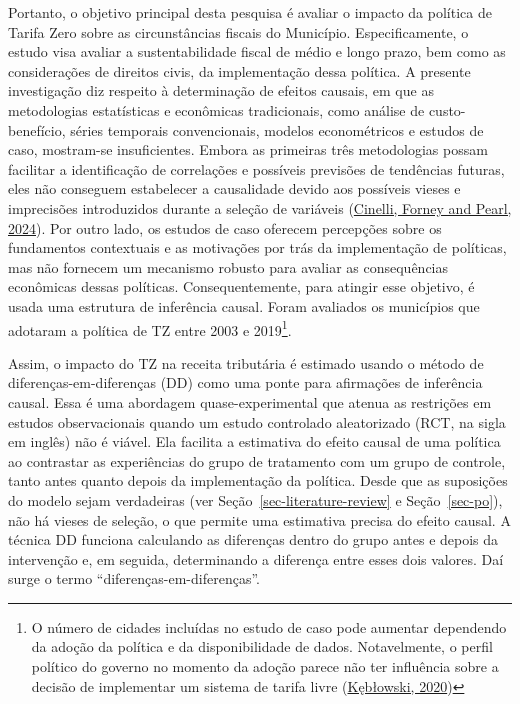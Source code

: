 \documentclass[12pt, a4paper, twoside]{article}
\numberwithin{equation}{subsection} %
\begin{document}
Portanto, o objetivo principal desta pesquisa é avaliar o impacto da
política de Tarifa Zero sobre as circunstâncias fiscais do Município.
Especificamente, o estudo visa avaliar a sustentabilidade fiscal de
médio e longo prazo, bem como as considerações de direitos civis, da
implementação dessa política. A presente investigação diz respeito à
determinação de efeitos causais, em que as metodologias estatísticas e
econômicas tradicionais, como análise de custo-benefício, séries
temporais convencionais, modelos econométricos e estudos de caso,
mostram-se insuficientes. Embora as primeiras três metodologias possam
facilitar a identificação de correlações e possíveis previsões de
tendências futuras, eles não conseguem estabelecer a causalidade devido
aos possíveis vieses e imprecisões introduzidos durante a seleção de
variáveis (\protect\hyperlink{ref-Cinelli-2024}{Cinelli, Forney and
Pearl, 2024}). Por outro lado, os estudos de caso oferecem percepções
sobre os fundamentos contextuais e as motivações por trás da
implementação de políticas, mas não fornecem um mecanismo robusto para
avaliar as consequências econômicas dessas políticas. Consequentemente,
para atingir esse objetivo, é usada uma estrutura de inferência causal.
Foram avaliados os municípios que adotaram a política de TZ entre 2003 e
2019\footnote{O número de cidades incluídas no estudo de caso pode
  aumentar dependendo da adoção da política e da disponibilidade de
  dados. Notavelmente, o perfil político do governo no momento da adoção
  parece não ter influência sobre a decisão de implementar um sistema de
  tarifa livre (\protect\hyperlink{ref-keblowski_why_2020}{Kębłowski,
  2020})}.

Assim, o impacto do TZ na receita tributária é estimado usando o método
de diferenças-em-diferenças (DD) como uma ponte para afirmações de
inferência causal. Essa é uma abordagem quase-experimental que atenua as
restrições em estudos observacionais quando um estudo controlado
aleatorizado (RCT, na sigla em inglês) não é viável. Ela facilita a
estimativa do efeito causal de uma política ao contrastar as
experiências do grupo de tratamento com um grupo de controle, tanto
antes quanto depois da implementação da política. Desde que as
suposições do modelo sejam verdadeiras (ver
Seção~\ref{sec-literature-review} e Seção~\ref{sec-po}), não há vieses
de seleção, o que permite uma estimativa precisa do efeito causal. A
técnica DD funciona calculando as diferenças dentro do grupo antes e
depois da intervenção e, em seguida, determinando a diferença entre
esses dois valores. Daí surge o termo ``diferenças-em-diferenças''.
\end{document}
